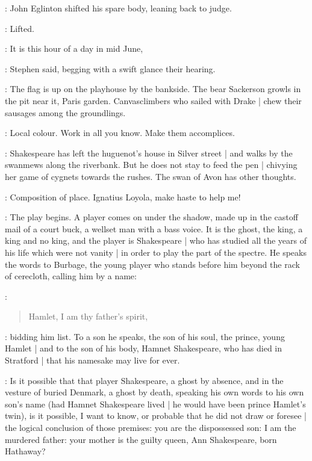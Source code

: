 :
John Eglinton shifted his spare body,
leaning back to judge.

\StephenInt:
Lifted.

\Stephen:
It is this hour of a day in mid June,

:
Stephen said,
begging with a swift glance their hearing.

\Stephen:
The flag is up on the playhouse by the bankside.
The bear Sackerson growls in the pit near it,
Paris garden.
Canvasclimbers who sailed with Drake |
chew their sausages among the groundlings.

\StephenInt:
Local colour.
Work in all you know.
Make them accomplices.

\Stephen:
Shakespeare has left the huguenot's house in Silver street |
and walks by the swanmews along the riverbank.
But he does not stay to feed the pen |
chivying her game of cygnets towards the rushes.
The swan of Avon has other thoughts.

\StephenInt:
Composition of place.
Ignatius Loyola,
make haste to help me!

\Stephen:
The play begins.
A player comes on under the shadow,
made up in the castoff mail of a court buck,
a wellset man with a bass voice.
It is the ghost,
the king,
a king and no king,
and the player is Shakespeare |
who has studied  all the years of his life which were not vanity |
in order to play the part of the spectre.
He speaks the words to Burbage,
the young player who stands before him beyond the rack of cerecloth,
calling him by a name:

\Stephen:
\begin{verse}
    Hamlet, I am thy father's spirit,
\end{verse}

\Stephen:
bidding him list.
To a son he speaks,
the son of his soul,
the prince,
young Hamlet |
and to the son of his body,
Hamnet Shakespeare,
who has died in Stratford |
that his namesake may live for ever.

\Stephen:
Is it possible that that player Shakespeare,
a ghost by absence,
and in the vesture of buried Denmark,
a ghost by death,
speaking his own words to his own son's name
(had Hamnet Shakespeare lived |
he would have been prince Hamlet's twin),
is it possible,
I want to know,
or probable that he did not draw or foresee |
the logical conclusion of those premises:
you are the dispossessed son:
I am the murdered father:
your mother is the guilty queen,
Ann Shakespeare,
born Hathaway?

